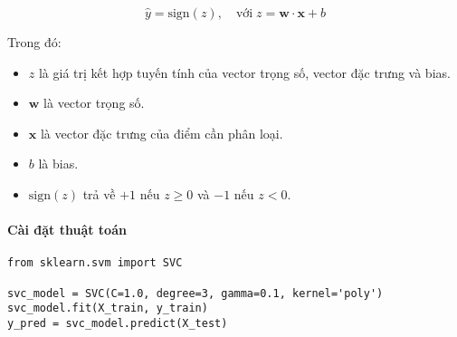 \documentclass[a4paper,12pt]{article}
\begin{document}
\[
\hat{y} = \text{sign}(z), \quad \text{với} \; z = \mathbf{w} \cdot \mathbf{x} + b
\]

\noindent Trong đó:
\begin{itemize}
    \item \(z\) là giá trị kết hợp tuyến tính của vector trọng số, vector đặc trưng và bias.
    \item \(\mathbf{w}\) là vector trọng số.
    \item \(\mathbf{x}\) là vector đặc trưng của điểm cần phân loại.
    \item \(b\) là bias.
    \item \(\text{sign}(z)\) trả về \(+1\) nếu \(z \geq 0\) và \(-1\) nếu \(z < 0\).
\end{itemize}


\paragraph{Cài đặt thuật toán}

\begin{verbatim}
from sklearn.svm import SVC

svc_model = SVC(C=1.0, degree=3, gamma=0.1, kernel='poly')
svc_model.fit(X_train, y_train)
y_pred = svc_model.predict(X_test)
\end{verbatim}
\end{document}
